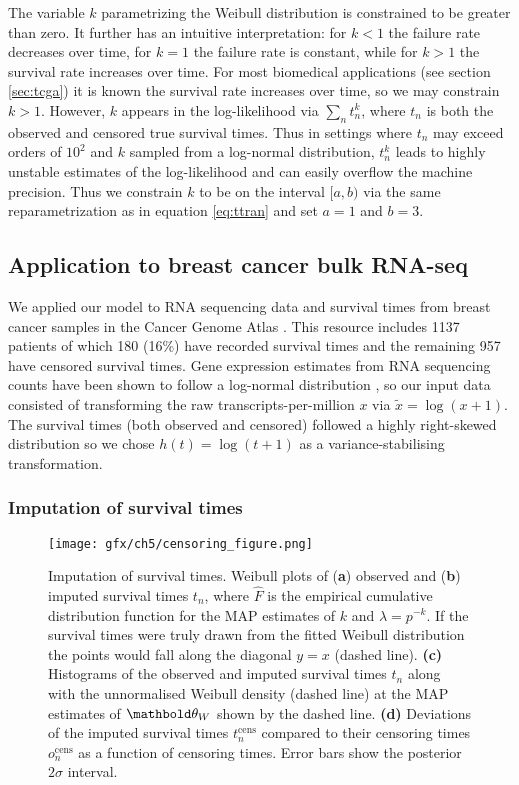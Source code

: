 The variable $k$ parametrizing the Weibull distribution is constrained to be greater than zero. It further has an intuitive interpretation: for $k < 1$ the failure rate decreases over time, for $k = 1$ the failure rate is constant, while for $k > 1$ the survival rate increases over time. For most biomedical applications (see section \ref{sec:tcga}) it is known the survival rate increases over time, so we may constrain $k > 1$. However, $k$ appears in the log-likelihood via $\sum_n t_n^k$, where $t_n$ is both the observed and censored true survival times. Thus in settings where $t_n$ may exceed orders of $10^2$ and $k$ sampled from a log-normal distribution, $t_n^k$ leads to highly unstable estimates of the log-likelihood and can easily overflow the machine precision. Thus we constrain $k$ to be on the interval $[a, b)$ via the same reparametrization as in equation \ref{eq:ttran} and  set $a = 1$ and $b = 3$.


\subsection{Application to breast cancer bulk RNA-seq}


We applied our model to RNA sequencing data and survival times from breast cancer samples in the Cancer Genome Atlas \citep{Weinstein2013-ww,tatlow2016cloud}. This resource includes 1137 patients of which 180 (16\%) have recorded survival times and the remaining 957 have censored survival times. Gene expression estimates from RNA sequencing counts have been shown to follow a log-normal distribution \citep{Law2014-tu,Pimentel2016-xz}, so our input data consisted of transforming the raw transcripts-per-million $x$ via $\tilde{x} = \log(x + 1)$. The survival times (both observed and censored) followed a highly right-skewed distribution so we chose $h(t) = \log(t + 1)$ as a variance-stabilising transformation.

\subsubsection{Imputation of survival times}

\begin{figure}
  \centering
\texttt{[image: gfx/ch5/censoring\_figure.png]}
\caption{Imputation of survival times. Weibull plots of (\textbf{a}) observed  and (\textbf{b}) imputed  survival times $t_n$, where $\hat{F}$ is the empirical cumulative distribution function for the MAP estimates of $k$ and $\lambda = p^{-k}$. If the survival times were truly drawn from the fitted Weibull distribution the points would fall along the diagonal $y=x$ (dashed line).
\textbf{(c)} Histograms of the observed and imputed survival times $t_n$ along with the unnormalised Weibull density (dashed line) at the MAP estimates of $\mbtheta_W$ shown by the dashed line.
\textbf{(d)} Deviations of the imputed survival times $t^{\text{cens}}_n$ compared to their censoring times $o^{\text{cens}}_n$ as a function of censoring times. Error bars show the posterior $2 \sigma$ interval.
} \label{fig:censoring_figure}
\end{figure}


